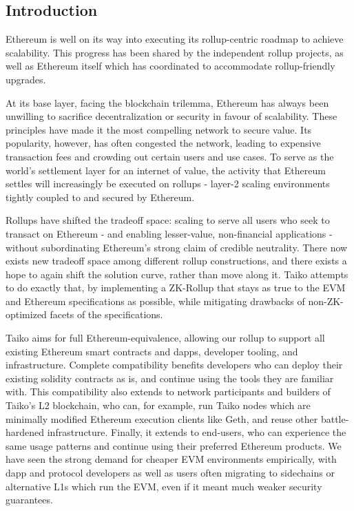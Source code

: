 \documentclass[9pt,oneside]{amsart}
\begin{document}
\setlength{\columnsep}{20pt}
\begin{multicols}{2}

\section{Introduction}
Ethereum is well on its way into executing its rollup-centric roadmap to achieve scalability\cite{rollup-centric}. This progress has been shared by the independent rollup projects, as well as Ethereum itself which has coordinated to accommodate rollup-friendly upgrades. 

At its base layer, facing the blockchain trilemma, Ethereum has always been unwilling to sacrifice decentralization or security in favour of scalability. These principles have made it the most compelling network to secure value. Its popularity, however, has often congested the network, leading to expensive transaction fees and crowding out certain users and use cases. To serve as the world's settlement layer for an internet of value, the activity that Ethereum settles will increasingly be executed on rollups - layer-2 scaling environments tightly coupled to and secured by Ethereum.

Rollups have shifted the tradeoff space: scaling to serve all users who seek to transact on Ethereum - and enabling lesser-value, non-financial applications - without subordinating Ethereum's strong claim of credible neutrality. There now exists new tradeoff space among different rollup constructions, and there exists a hope to again shift the solution curve, rather than move along it. Taiko attempts to do exactly that, by implementing a ZK-Rollup that stays as true to the EVM and Ethereum specifications as possible, while mitigating drawbacks of non-ZK-optimized facets of the specifications.

Taiko aims for full Ethereum-equivalence, allowing our rollup to support all existing Ethereum smart contracts and dapps, developer tooling, and infrastructure. Complete compatibility benefits developers who can deploy their existing solidity contracts as is, and continue using the tools they are familiar with. This compatibility also extends to network participants and builders of Taiko's L2 blockchain, who can, for example, run Taiko nodes which are minimally modified Ethereum execution clients like Geth, and reuse other battle-hardened infrastructure. Finally, it extends to end-users, who can experience the same usage patterns and continue using their preferred Ethereum products. We have seen the strong demand for cheaper EVM environments empirically, with dapp and protocol developers as well as users often migrating to sidechains or alternative L1s which run the EVM, even if it meant much weaker security guarantees.


\end{multicols}
\end{document}
